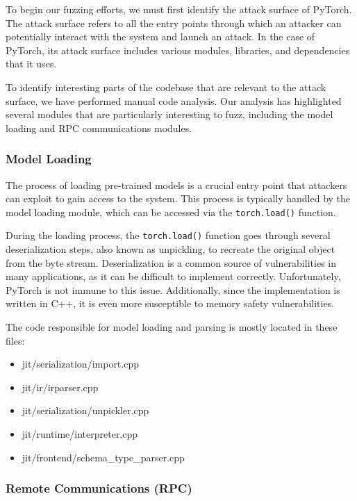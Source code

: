 To begin our fuzzing efforts, we must first identify the attack surface of PyTorch. The attack surface refers to all the entry points through which an attacker can potentially interact with the system and launch an attack. In the case of PyTorch, its attack surface includes various modules, libraries, and dependencies that it uses.

To identify interesting parts of the codebase that are relevant to the attack surface, we have performed manual code analysis. Our analysis has highlighted several modules that are particularly interesting to fuzz, including the model loading and RPC communications modules.

\subsubsection{Model Loading}

The process of loading pre-trained models is a crucial entry point that attackers can exploit to gain access to the system. This process is typically handled by the model loading module, which can be accessed via the \texttt{torch.load()} function.

During the loading process, the \texttt{torch.load()} function goes through several deserialization steps, also known as unpickling, to recreate the original object from the byte stream. Deserialization is a common source of vulnerabilities in many applications, as it can be difficult to implement correctly. Unfortunately, PyTorch is not immune to this issue. Additionally, since the implementation is written in C++, it is even more susceptible to memory safety vulnerabilities.

The code responsible for model loading and parsing is mostly located in these files:

\begingroup
\begin{itemize}
    \item jit/serialization/import.cpp
    \item jit/ir/irparser.cpp
    \item jit/serialization/unpickler.cpp
    \item jit/runtime/interpreter.cpp
    \item jit/frontend/schema\_type\_parser.cpp
\end{itemize}
\endgroup

\subsubsection{Remote Communications (RPC)}


